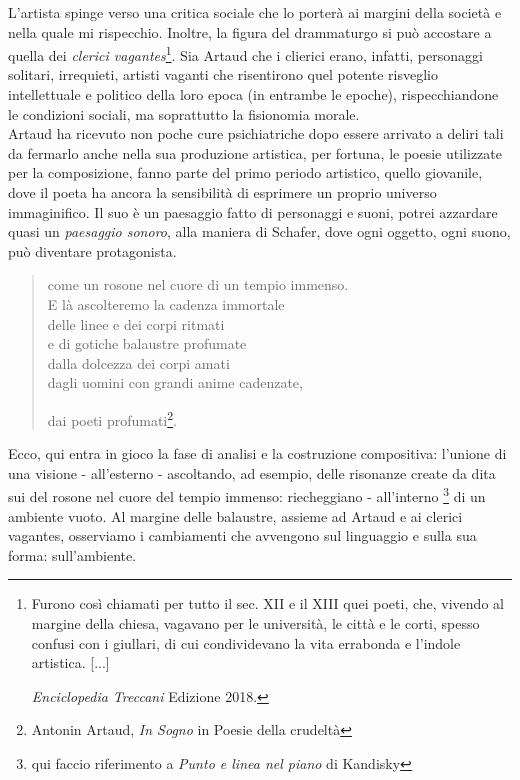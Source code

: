L'artista spinge verso una critica sociale che lo porterà ai margini della società e nella quale mi rispecchio. Inoltre, la figura del drammaturgo si può accostare a quella dei \textit{clerici vagantes}\footnote{Furono così chiamati per tutto il sec. XII e il XIII quei poeti, che, vivendo al margine della chiesa, vagavano per le università, le città e le corti, spesso confusi con i giullari, di cui condividevano la vita errabonda e l'indole artistica. [...]

\textit{Enciclopedia Treccani} Edizione 2018.}. Sia Artaud che i clierici erano, infatti, personaggi solitari, irrequieti, artisti vaganti che risentirono quel potente risveglio intellettuale e politico della loro epoca (in entrambe le epoche), rispecchiandone le condizioni sociali, ma soprattutto la fisionomia morale. \\
Artaud ha ricevuto non poche cure psichiatriche dopo essere arrivato a deliri tali da fermarlo anche nella sua produzione artistica, per fortuna, le poesie utilizzate per la composizione, fanno parte del primo periodo artistico, quello giovanile, dove il poeta ha ancora la sensibilità di esprimere un proprio universo immaginifico. Il suo è un paesaggio fatto di personaggi e suoni, potrei azzardare quasi un \textit{paesaggio sonoro}, alla maniera di Schafer, dove ogni oggetto, ogni suono, può diventare protagonista.

\begin{quotation}
{\sf [...] come un rosone nel cuore di un tempio immenso. \\
E là ascolteremo la cadenza immortale \\
delle linee e dei corpi ritmati \\
e di gotiche balaustre profumate \\
dalla dolcezza dei corpi amati \\
dagli uomini con grandi anime cadenzate, \\
\centerline{dai poeti profumati\footnote{Antonin Artaud, \textit{In Sogno} in Poesie della crudeltà}.}}
\end{quotation}

Ecco, qui entra in gioco la fase di analisi e la costruzione compositiva: l'unione di una visione - all'esterno - ascoltando, ad esempio, delle risonanze create da dita sui del rosone nel cuore del tempio immenso: riecheggiano - all'interno \footnote{qui faccio riferimento a \textit{Punto e linea nel piano} di Kandisky} di un ambiente vuoto.
Al margine delle balaustre, assieme ad Artaud e ai clerici vagantes, osserviamo i cambiamenti che avvengono sul linguaggio e sulla sua forma: sull'ambiente.

